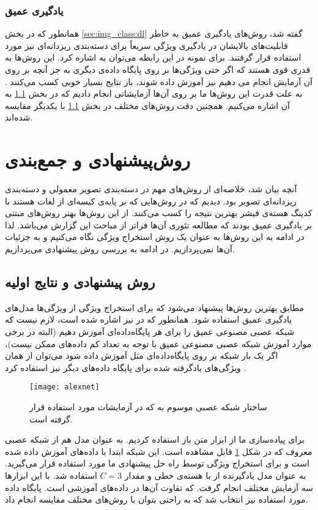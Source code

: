 \documentclass[11pt]{article}
\begin{document}
\subsubsection{یادگیری عمیق}

همانطور که در بخش
\ref{sec:img_class:dl}
گفته شد، روش‌های یادگیری عمیق به خاطر قابلیت‌های بالایشان در یادگیری ویژگی سریعاً برای دسته‌بندی ریزدانه‌ای نیز مورد استفاده قرار گرفتند. برای نمونه در این رابطه می‌توان به
\cite{razavian2014, krause2014, partrcnn}
اشاره کرد. این روش‌ها به قدری قوی هستند که اگر حتی ویژگی‌ها بر روی پایگاه داده‌ی دیگری به جز آنچه بر روی آن آزمایش انجام می دهیم نیز آموزش داده شوند، باز نتایج بسیار خوبی کسب می‌کنند
\cite{razavian2014}.
به علت قدرت این روش‌ها ما بر روی آن‌ها آزمایشاتی انجام دادیم که در بخش
\ref{sec:results}
به آن اشاره می‌کنیم. همچنین دقت روش‌های مختلف در بخش
\ref{sec:results}
با یکدیگر مقایسه شده‌اند.
\section{روش‌پیشنهادی و جمع‌بندی}\label{sec:conc}
آنچه بیان شد، خلاصه‌ای از روش‌های مهم در دسته‌بندی تصویر معمولی و دسته‌بندی ریزدانه‌ای تصویر بود. دیدیم که در روش‌هایی که بر پایه‌ی کیسه‌ای از لغات هستند با کدینگ هسته‌ی فیشر بهترین نتیجه را کسب می‌کنند. از این روش‌ها بهتر روش‌های مبتنی بر یادگیری عمیق بودند که مطالعه تئوری آن‌ها فراتر از مباحث این گزارش می‌باشد. لذا در ادامه به این روش‌ها به عنوان یک روش استخراج ویژگی نگاه می‌کنیم و به جزئیات آن‌ها نمی‌پردازیم. در ادامه به بررسی روش پیشنهادی می‌پردازیم.
\subsection{روش پیشنهادی و نتایج اولیه}\label{sec:results}
مطابق بهترین روش‌ها پیشنهاد می‌شود که برای استخراج ویژگی از ویژگی‌ها مدل‌های یادگیری عمیق استفاده شود. همانطور که در
\cite{razavian2014}
نیز اشاره شده است، لازم نیست که شبکه عصبی مصنوعی عمیق را برای هر پایگاه‌داده‌ای آموزش دهیم (البته در برخی موارد آموزش شبکه عصبی مصنوعی عمیق با توجه به تعداد کم داده‌های ممکن نیست)، اگر یک بار شبکه بر روی پایگاه‌داده‌ای مثل
 \cite{ilsvrc}
آموزش داده شود می‌توان از همان ویژگی‌های یادگرفته شده برای پایگاه داده‌های دیگر نیز استفاده کرد
\cite{razavian2014}.
\begin{figure}[t]
	\centering
	\texttt{[image: alexnet]}
	\caption{ساختار شبکه عصبی موسوم به
	\cite{alexnet} که در آزمایشات مورد استفاده قرار گرفته است.}
	\label{fig:conc:alexnet}
\end{figure}
برای پیاده‌سازی ما از ابزار متن باز
 \cite{caffe}
استفاده کردیم. به عنوان مدل هم از شبکه عصبی معروف
 \cite{alexnet}
که در شکل
\ref{fig:conc:alexnet} قابل مشاهده است.
این شبکه ابتدا با داده‌های
 \cite{ilsvrc}
آموزش داده شده است و برای استخراج ویژگی توسط راه حل پیشنهادی ما مورد استفاده قرار می‌گیرید. به عنوان مدل یادگیرنده از
 \cite{svm}
با هسته‌ی خطی و مقدار
$C = 3$
استفاده شد. با این ابزارها سه آزمایش مختلف انجام گرفت. که تفاوت آن‌ها در داده‌های آموزشی است. پایگاه داده مورد استفاده نیز
 \cite{cub2002011}
انتخاب شد که به راحتی بتوان با روش‌های مختلف مقایسه انجام داد.
\end{document}
